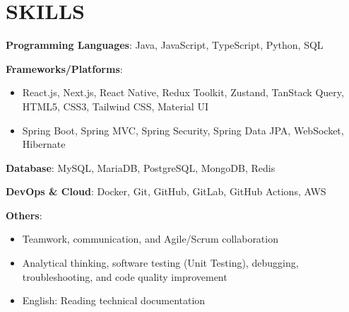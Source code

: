 \section{SKILLS}
\resumeSubHeadingListStart

  \item
    \resumeItemListStart
      \item \textbf{Programming Languages}: Java, JavaScript, TypeScript, Python, SQL
      \item \textbf{Frameworks/Platforms}:
        \begin{itemize}
          \item React.js, Next.js, React Native, Redux Toolkit, Zustand, TanStack Query, HTML5, CSS3, Tailwind CSS, Material UI
          \item Spring Boot, Spring MVC, Spring Security, Spring Data JPA, WebSocket, Hibernate
        \end{itemize}
      \item \textbf{Database}: MySQL, MariaDB, PostgreSQL, MongoDB, Redis
      \item \textbf{DevOps \& Cloud}: Docker, Git, GitHub, GitLab, GitHub Actions, AWS
      \item \textbf{Others}:
        \begin{itemize}
          \item Teamwork, communication, and Agile/Scrum collaboration
          \item Analytical thinking, software testing (Unit Testing), debugging, troubleshooting, and code quality improvement
          \item English: Reading technical documentation
        \end{itemize}
    \resumeItemListEnd

\resumeSubHeadingListEnd
